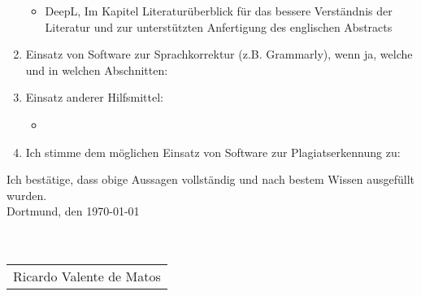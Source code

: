 \begin{enumerate}
	\begin{itemize}
		\item DeepL, Im Kapitel Literaturüberblick für das bessere Verständnis der Literatur und zur unterstützten Anfertigung des englischen Abstracts
	\end{itemize}
	\item Einsatz von Software zur Sprachkorrektur (z.B. Grammarly), wenn ja, welche und in welchen Abschnitten:
	\item Einsatz anderer Hilfsmittel:
	\begin{itemize}
		\item 
	\end{itemize}
	\item Ich stimme dem möglichen Einsatz von Software zur Plagiatserkennung zu:
\end{enumerate}

Ich bestätige, dass obige Aussagen vollständig und nach bestem Wissen ausgefüllt wurden.\\

Dortmund, den \today \\ \\ \\
\begin{tabular}{@{}l@{}}\hline
	Ricardo Valente de Matos
\end{tabular}